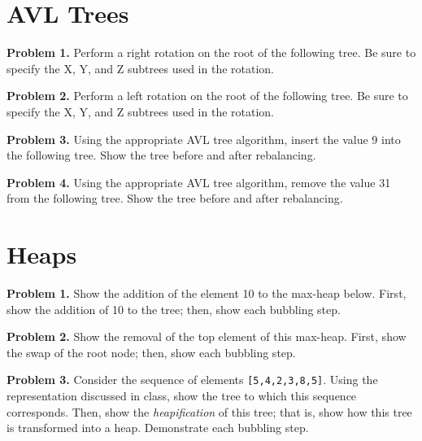 \documentclass{article}
\begin{document}
\section{AVL Trees}

\noindent \textbf{Problem 1.} Perform a right rotation on the root of the following tree.  Be sure to specify the X, Y, and Z subtrees used in the rotation.


\noindent \textbf{Problem 2.} Perform a left rotation on the root of the following tree.  Be sure to specify the X, Y, and Z subtrees used in the rotation.



\noindent \textbf{Problem 3.} Using the appropriate AVL tree algorithm, insert the value 9 into the following tree.  Show the tree before and after rebalancing.



\noindent \textbf{Problem 4.} Using the appropriate AVL tree algorithm, remove the value 31 from the following tree.  Show the tree before and after rebalancing.



\section{Heaps}

\noindent \textbf{Problem 1.} Show the addition of the element 10 to the max-heap below.  First, show the addition of 10 to the tree; then, show each bubbling step.



\noindent \textbf{Problem 2.} Show the removal of the top element of this max-heap.  First, show the swap of the root node; then, show each bubbling step.



\noindent \textbf{Problem 3.} Consider the sequence of elements \texttt{[5,4,2,3,8,5]}.  Using the representation discussed in class, show the tree to which this sequence corresponds.  Then, show the \textit{heapification} of this tree; that is, show how this tree is transformed into a heap.  Demonstrate each bubbling step.


\end{document}
